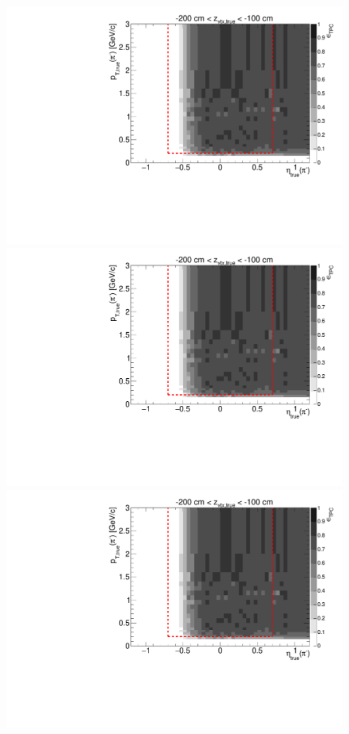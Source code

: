 \begin{figure}[hb]
{  \includegraphics[width=\linewidth,page=6]{graphics/eff/Eff2D_TPC_pion_Minus.pdf}\\
  \includegraphics[width=\linewidth,page=8]{graphics/eff/Eff2D_TPC_pion_Minus.pdf}\\
  \includegraphics[width=\linewidth,page=10]{graphics/eff/Eff2D_TPC_pion_Minus.pdf}
}%
\end{figure}

